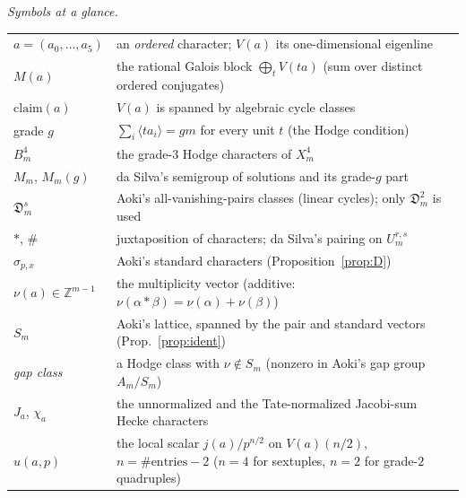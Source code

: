 \documentclass[11pt]{amsart}
\theoremstyle{remark}
\newcommand{\Z}{\mathbb{Z}}
\newcommand{\Ds}{\mathfrak{D}}
\newcommand{\fr}[1]{\langle #1\rangle}
\newcommand{\V}{V}
\begin{document}
\medskip
\noindent\emph{Symbols at a glance.}
\begin{center}\small
\begin{tabular}{l>{\raggedright\arraybackslash}p{10.4cm}}
\toprule
$a=(a_0,\dots,a_5)$ & an \emph{ordered} character; $\V(a)$ its one-dimensional eigenline\\
$M(a)$ & the rational Galois block $\bigoplus_{t}\V(ta)$ (sum over distinct ordered conjugates)\\
$\mathrm{claim}(a)$ & $\V(a)$ is spanned by algebraic cycle classes\\
grade $g$ & $\sum_i\fr{ta_i}=gm$ for every unit $t$ (the Hodge condition)\\
$B^4_m$ & the grade-$3$ Hodge characters of $X^4_m$\\
$M_m$, $M_m(g)$ & da Silva's semigroup of solutions and its grade-$g$ part\\
$\Ds^s_m$ & Aoki's all-vanishing-pairs classes (linear cycles); only $\Ds^2_m$ is used\\
$*$, $\#$ & juxtaposition of characters; da Silva's pairing on $U^{r,s}_m$\\
$\sigma_{p,x}$ & Aoki's standard characters (Proposition~\ref{prop:D})\\
$\nu(a)\in\Z^{m-1}$ & the multiplicity vector (additive: $\nu(\alpha*\beta)=\nu(\alpha)+\nu(\beta)$)\\
$S_m$ & Aoki's lattice, spanned by the pair and standard vectors (Prop.~\ref{prop:ident})\\
\emph{gap class} & a Hodge class with $\nu\notin S_m$ (nonzero in Aoki's gap group $A_m/S_m$)\\
$J_a$, $\chi_a$ & the unnormalized and the Tate-normalized Jacobi-sum Hecke characters\\
$u(a,p)$ & the local scalar $j(a)/p^{n/2}$ on $\V(a)(n/2)$, $n=\#\text{entries}-2$
($n=4$ for sextuples, $n=2$ for grade-$2$ quadruples)\\
\bottomrule
\end{tabular}
\end{center}
\medskip
\end{document}

